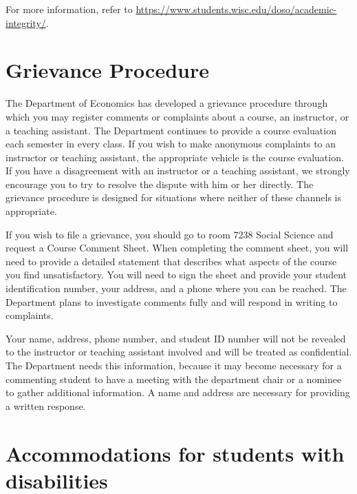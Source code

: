 \documentclass[
]{book}
\begin{document}
For more information, refer to \url{https://www.students.wisc.edu/doso/academic-integrity/}.

\hypertarget{grievance-procedure}{%
\section{Grievance Procedure}\label{grievance-procedure}}

The Department of Economics has developed a grievance procedure through which you may register comments or complaints about a course, an instructor, or a teaching assistant. The Department continues to provide a course evaluation each semester in every class. If you wish to make anonymous complaints to an instructor or teaching assistant, the appropriate vehicle is the course evaluation. If you have a disagreement with an instructor or a teaching assistant, we strongly encourage you to try to resolve the dispute with him or her directly. The grievance procedure is designed for situations where neither of these channels is appropriate.

If you wish to file a grievance, you should go to room 7238 Social Science and request a Course Comment Sheet. When completing the comment sheet, you will need to provide a detailed statement that describes what aspects of the course you find unsatisfactory. You will need to sign the sheet and provide your student identification number, your address, and a phone where you can be reached. The Department plans to investigate comments fully and will respond in writing to complaints.

Your name, address, phone number, and student ID number will not be revealed to the instructor or teaching assistant involved and will be treated as confidential. The Department needs this information, because it may become necessary for a commenting student to have a meeting with the department chair or a nominee to gather additional information. A name and address are necessary for providing a written response.

\hypertarget{accommodations-for-students-with-disabilities}{%
\section{Accommodations for students with disabilities}\label{accommodations-for-students-with-disabilities}}
\end{document}

